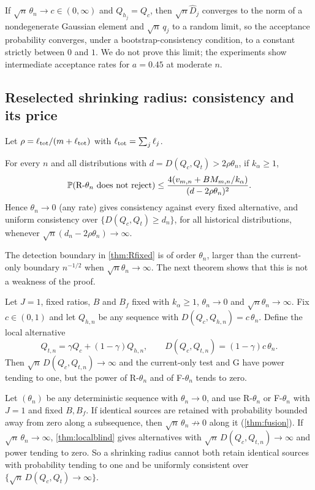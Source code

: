 \documentclass[11pt,a4paper]{article}
\begin{document}
\begin{remark}[The boundary rate $a=1/2$]
If $\sqrt n\,\theta_n\to c\in(0,\infty)$ and $Q_{h_j}=Q_c$, then $\sqrt n\hat D_j$ converges to the norm of a nondegenerate Gaussian element and $\sqrt n\,q_j$ to a random limit, so the acceptance probability converges, under a bootstrap-consistency condition, to a constant strictly between $0$ and $1$. We do not prove this limit; the experiments show intermediate acceptance rates for $a=0.45$ at moderate $n$.
\end{remark}

\subsection{Reselected shrinking radius: consistency and its price}\label{sec:Rpower}

Let $\rho=\ell_{\rm tot}/(m+\ell_{\rm tot})$ with $\ell_{\rm tot}=\sum_j\ell_j$.

\begin{theorem}\label{thm:Rfixed}
For every $n$ and all distributions with $d=D(Q_c,Q_t)>2\rho\theta_n$, if $k_\alpha\ge1$,
\[
\P(\text{R-}\theta_n\text{ does not reject})\le\frac{4(v_{m,n}+BM_{m,n}/k_\alpha)}{(d-2\rho\theta_n)^2}.
\]
Hence $\theta_n\to0$ (any rate) gives consistency against every fixed alternative, and uniform consistency over $\{D(Q_c,Q_t)\ge d_n\}$, for all historical distributions, whenever $\sqrt n(d_n-2\rho\theta_n)\to\infty$.
\end{theorem}

The detection boundary in \cref{thm:Rfixed} is of order $\theta_n$, larger than the current-only boundary $n^{-1/2}$ when $\sqrt n\theta_n\to\infty$. The next theorem shows that this is not a weakness of the proof.

\begin{theorem}\label{thm:localblind}
Let $J=1$, fixed ratios, $B$ and $B_f$ fixed with $k_\alpha\ge1$, $\theta_n\to0$ and $\sqrt n\theta_n\to\infty$. Fix $c\in(0,1)$ and let $Q_{h,n}$ be any sequence with $D(Q_c,Q_{h,n})=c\,\theta_n$. Define the local alternative
\[
Q_{t,n}=\gamma Q_c+(1-\gamma)Q_{h,n},\qquad D(Q_c,Q_{t,n})=(1-\gamma)c\,\theta_n .
\]
Then $\sqrt n\,D(Q_c,Q_{t,n})\to\infty$ and the current-only test and G have power tending to one, but the power of R-$\theta_n$ and of F-$\theta_n$ tends to zero.
\end{theorem}

\begin{corollary}\label{cor:tradeoff}
Let $(\theta_n)$ be any deterministic sequence with $\theta_n\to0$, and use R-$\theta_n$ or F-$\theta_n$ with $J=1$ and fixed $B,B_f$. If identical sources are retained with probability bounded away from zero along a subsequence, then $\sqrt n\,\theta_n\not\to0$ along it (\cref{thm:fusion}). If $\sqrt n\,\theta_n\to\infty$, \cref{thm:localblind} gives alternatives with $\sqrt n\,D(Q_c,Q_{t,n})\to\infty$ and power tending to zero. So a shrinking radius cannot both retain identical sources with probability tending to one and be uniformly consistent over $\{\sqrt n\,D(Q_c,Q_t)\to\infty\}$.
\end{corollary}
\end{document}
